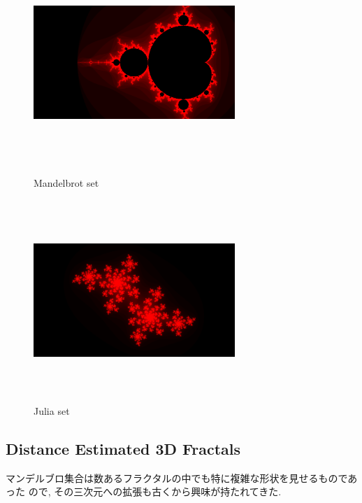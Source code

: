\begin{figure}[htbp]
 \begin{minipage}{0.49\hsize}
  \begin{center}
   \includegraphics[width=3in, height=3in, keepaspectratio]{../img/fractal/mandelbrot.pdf}
   \caption{Mandelbrot set}
   \label{fig:mandelbrot}
  \end{center}
 \end{minipage}
 \begin{minipage}{0.49\hsize}
     \includegraphics[width=3in, height=3in, keepaspectratio]{../img/fractal/julia.pdf}
   \caption{Julia set}
   \label{fig:julia}
 \end{minipage}
\end{figure}

\subsection{Distance Estimated 3D Fractals}

マンデルブロ集合は数あるフラクタルの中でも特に複雑な形状を見せるものであった
ので, その三次元への拡張も古くから興味が持たれてきた.

